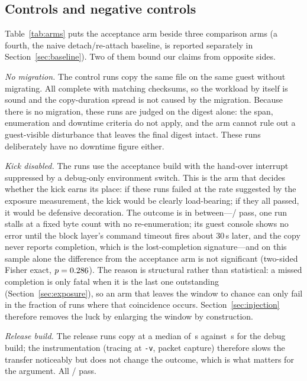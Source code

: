 \documentclass[10pt,conference]{IEEEtran}
\newcommand{\code}[1]{\texttt{#1}}
\begin{document}
\subsection{Controls and negative controls}
\label{sec:arms}
Table~\ref{tab:arms} puts the acceptance arm beside three comparison arms (a fourth, the naive detach/re-attach baseline, is reported separately in Section~\ref{sec:baseline}).
Two of them bound our claims from opposite sides.

\emph{No migration.} The \ControlRuns{} control runs copy the same file on the
same guest without migrating. All complete with matching checksums, so the
workload by itself is sound and the copy-duration spread is not caused by the
migration. Because there is no migration, these runs are judged on the digest
alone: the span, enumeration and downtime criteria do not apply, and the arm
cannot rule out a guest-visible disturbance that leaves the final digest intact.
These runs deliberately have no downtime figure either.

\emph{Kick disabled.} The \KickOffRuns{} runs use the acceptance build with the
hand-over interrupt suppressed by a debug-only environment switch. This is the
arm that decides whether the kick earns its place: if these runs failed at the
rate suggested by the exposure measurement, the kick would be clearly
load-bearing; if they all passed, it would be defensive decoration. The outcome
is in between---\KickOffPass/\KickOffRuns{} pass, one run stalls at a fixed byte
count with no re-enumeration; its guest console shows no error until the block
layer's command timeout fires about 30\,s later, and the copy never reports
completion, which is the lost-completion signature---and on this sample alone the
difference from the acceptance arm is
not significant (two-sided Fisher exact, $p=0.286$). The reason is structural rather
than statistical: a missed completion is only fatal when it is the last one
outstanding (Section~\ref{sec:exposure}), so an arm that leaves the window to
chance can only fail in the fraction of runs where that coincidence occurs.
Section~\ref{sec:injection} therefore removes the luck by enlarging the window by
construction.

\emph{Release build.} The \ReleaseRuns{} release runs copy at a median of
\ReleaseCopyMedian\,s against \CopyMedian\,s for the debug build; the
instrumentation (tracing at \code{-v}, packet capture) therefore slows the
transfer noticeably but does not change the outcome, which is what matters for
the argument. All \ReleasePass{}/\ReleaseRuns{} pass.
\end{document}
